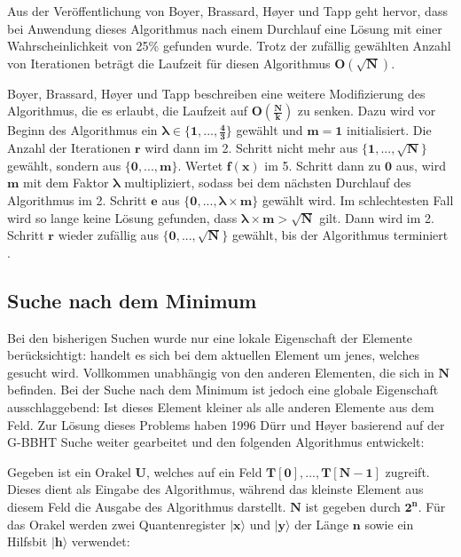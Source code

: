 Aus der Veröffentlichung von Boyer, Brassard, Høyer und Tapp geht hervor, dass bei Anwendung dieses Algorithmus nach einem Durchlauf eine Lösung mit einer Wahrscheinlichkeit von 25\% gefunden wurde. 
Trotz der zufällig gewählten Anzahl von Iterationen beträgt die Laufzeit für diesen Algorithmus $\mathbf{O(\sqrt{N})}$.

Boyer, Brassard, Høyer und Tapp beschreiben eine weitere Modifizierung des Algorithmus, die es erlaubt, die Laufzeit auf $\mathbf{O(\frac{N}{k})}$ zu senken. 
Dazu wird vor Beginn des Algorithmus ein $\mathbf{\pmb\lambda \in \{1, ..., \frac{4}{3} \} }$ gewählt und $\mathbf{m = 1}$ initialisiert. Die Anzahl der Iterationen $\mathbf{r}$ wird dann im 2. Schritt nicht mehr aus $\mathbf{\{1, ..., \sqrt{N}\}}$ gewählt, sondern aus $\mathbf{\{0, ..., m\}}$. 
Wertet $\mathbf{f(x)}$ im 5. Schritt dann zu $\mathbf{0}$ aus, wird $\mathbf{m}$ mit dem Faktor $\mathbf{\pmb\lambda}$ multipliziert, sodass bei dem nächsten Durchlauf des Algorithmus im 2. Schritt $\mathbf{e}$ aus $\mathbf{\{0, ..., \pmb\lambda \times m\}}$  gewählt wird. 
Im schlechtesten Fall wird so lange keine Lösung gefunden, dass $\mathbf{\pmb\lambda \times m > \sqrt{N}}$ gilt. Dann wird im 2. Schritt $\mathbf{r}$ wieder zufällig aus $\mathbf{\{0, ..., \sqrt{N}\}}$ gewählt, bis der Algorithmus terminiert \cite{Boyer.1998}.


\subsection{Suche nach dem Minimum} \label{minimum}
Bei den bisherigen Suchen wurde nur eine lokale Eigenschaft der Elemente berücksichtigt: handelt es sich bei dem aktuellen Element um jenes, welches gesucht wird. 
Vollkommen unabhängig von den anderen Elementen, die sich in $\mathbf{N}$ befinden. Bei der Suche nach dem Minimum ist jedoch eine globale Eigenschaft ausschlaggebend: Ist dieses Element kleiner als alle anderen Elemente aus dem Feld.
Zur Lösung dieses Problems haben 1996 Dürr und Høyer basierend auf der G-BBHT Suche weiter gearbeitet und den folgenden Algorithmus entwickelt: 

Gegeben ist ein Orakel $\mathbf{U}$, welches auf ein Feld $\mathbf{T[0], ..., T[N-1]}$ zugreift. 
Dieses dient als Eingabe des Algorithmus, während das kleinste Element aus diesem Feld die Ausgabe des Algorithmus darstellt. $\mathbf{N}$ ist gegeben durch $\mathbf{2^n}$. 
Für das Orakel werden zwei Quantenregister $\mathbf{|x\rangle}$ und $\mathbf{|y\rangle}$ der Länge $\mathbf{n}$ sowie ein Hilfsbit $\mathbf{|h\rangle}$ verwendet:

